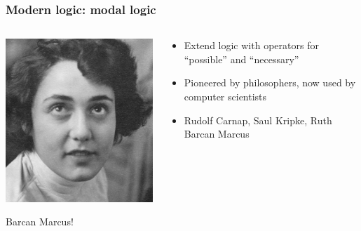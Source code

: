\begin{frame}
  \frametitle{Modern logic: modal logic}

  \begin{columns}
    \begin{column}{.5\textwidth}
      \includegraphics[height=.8\textheight]{../assets/barcan}
      
      Barcan Marcus!
    \end{column}
    \begin{column}{.5\textwidth}
      \begin{itemize}[<+->]
        \item Extend logic with operators for ``possible'' and ``necessary''
        \item Pioneered by philosophers, now used by computer scientists
        \item Rudolf Carnap, Saul Kripke, Ruth Barcan Marcus
      \end{itemize}
    \end{column}
  \end{columns}
\end{frame}




